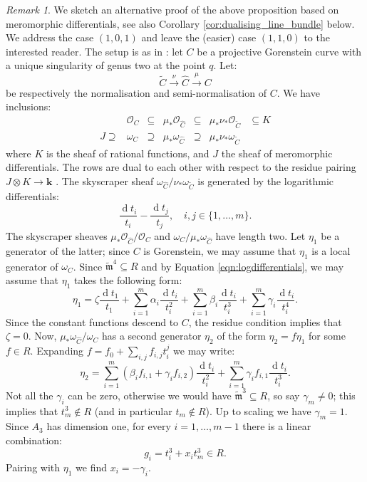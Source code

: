 \documentclass{compositio}
\renewcommand{\k}{\mathbf k}
\newcommand{\tm}{\widetilde{\mathfrak m}}
\newcommand{\OO}{\mathcal O}
\renewcommand{\to}{\rightarrow}
\theoremstyle{plain}
\theoremstyle{definition}
\theoremstyle{remark}
\newtheorem{rem}[thm]{Remark}
\begin{document}
\begin{rem}
 We sketch an alternative proof of the above proposition based on meromorphic differentials, see also Corollary \ref{cor:dualising_line_bundle} below. We address the case $(1,0,1)$ and leave the (easier) case $(1,1,0)$ to the interested reader. The setup is as in \cite[\S 2.1]{RSPW2}: let $C$ be a projective Gorenstein curve with a unique singularity of genus two at the point $q$. Let:
 \[ \widetilde C\xrightarrow{\nu}\widehat C\xrightarrow{\mu} C\]
 be respectively the normalisation and semi-normalisation of $C$. We have inclusions:
 \begin{align*}
  {} & \OO_C & \subseteq & \mu_* \OO_{\widehat C} & \subseteq & \mu_*\nu_* \OO_{\widetilde C} & \subseteq K \\
  J  \supseteq & \omega_C & \supseteq & \mu_* \omega_{\widehat C} & \supseteq & \mu_*\nu_* \omega_{\widetilde C}
 \end{align*}
where $K$ is the sheaf of rational functions, and $J$ the sheaf of meromorphic differentials. The rows are dual to each other with respect to the residue pairing $J\otimes K\to\k$ \cite[Proposition 1.16(ii)]{AK}. The skyscraper sheaf $\omega_{\widehat C}/\nu_* \omega_{\widetilde C}$ is generated by the logarithmic differentials:
\begin{equation}\label{eqn:logdifferentials}\frac{\operatorname{d} t_i}{t_i}-\frac{\operatorname{d} t_j}{t_j},\quad i,j\in\{1,\ldots,m\}.\end{equation}
The skyscraper sheaves $\mu_*\OO_{\widehat C}/\OO_C$ and $\omega_C/\mu_*\omega_{\widehat C}$ have length two. Let $\eta_1$ be a generator of the latter; since $C$ is Gorenstein, we may assume that $\eta_1$ is a local generator of $\omega_C$. Since $\tm^4\subseteq R$ and by Equation \eqref{eqn:logdifferentials}, we may assume that $\eta_1$ takes the following form:
\begin{equation}\label{eqn:eta1}\eta_1=\zeta\frac{\operatorname{d} t_1}{t_1}+\sum_{i=1}^m \alpha_i \frac{\operatorname{d} t_i}{t_i^2}+ \sum_{i=1}^m \beta_i \frac{\operatorname{d} t_i}{t_i^3}+ \sum_{i=1}^m \gamma_i \frac{\operatorname{d} t_i}{t_i^4}.\end{equation}
Since the constant functions descend to $C$, the residue condition implies that $\zeta=0$. Now, $\mu_*\omega_{\widehat C}/\omega_C$ has a second generator $\eta_2$ of the form $\eta_2=f\eta_1$ for some $f\in R$. Expanding $f=f_0+\sum_{i,j}f_{i,j}t_i^j$ we may write:
\begin{equation}\label{eqn:eta2}
 \eta_2=\sum_{i=1}^m(\beta_if_{i,1}+\gamma_if_{i,2})\frac{\operatorname{d} t_i}{t_i^2}+\sum_{i=1}^m\gamma_if_{i,1}\frac{\operatorname{d} t_i}{t_i^3}.
\end{equation}
Not all the $\gamma_i$ can be zero, otherwise we would have $\tm^3\subseteq R$, so say $\gamma_m\neq 0$; this implies that $t_m^3\notin R$ (and in particular $t_m\notin R$). Up to scaling we have $\gamma_m=1$. Since $A_3$ has dimension one, for every $i=1,\ldots,m-1$ there is a linear combination:
\[ g_i=t_i^3+x_it_m^3\in R.\]
Pairing with $\eta_1$ we find $x_i=-\gamma_i$.


\end{rem}
\end{document}
